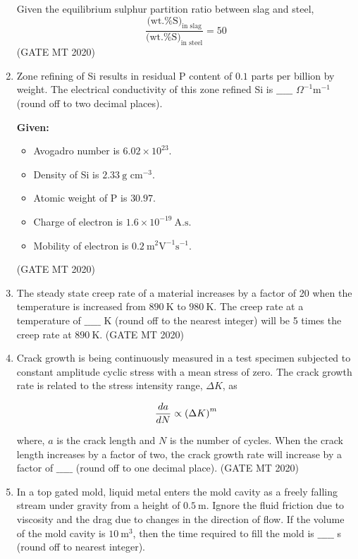\documentclass[journal, 11pt, onecolumn]{IEEEtran}
\theoremstyle{remark}
\begin{document}
\begin{enumerate}
Given the equilibrium sulphur partition ratio between slag and steel,  
$$
\frac{\text{(wt.\% S)}_{\text{in slag}}}{\text{(wt.\% S)}_{\text{in steel}}} = 50
$$
\hfill(GATE MT 2020)


\item Zone refining of Si results in residual P content of $0.1$ parts per billion by weight. The electrical conductivity of this zone refined Si is $\_\_\_\_\_$ $\Omega^{-1}\text{m}^{-1}$ (round off to two decimal places).  

\textbf{Given:}  
\begin{itemize}
\item Avogadro number is $6.02 \times 10^{23}$.  
\item Density of Si is $2.33 \ \text{g cm}^{-3}$.  
\item Atomic weight of P is $30.97$.  
\item Charge of electron is $1.6 \times 10^{-19} \ \text{A.s}$.  
\item Mobility of electron is $0.2 \ \text{m}^2 \text{V}^{-1} \text{s}^{-1}$.  
\end{itemize}
\hfill(GATE MT 2020)


\item The steady state creep rate of a material increases by a factor of 20 when the temperature is increased from $890 \ \text{K}$ to $980 \ \text{K}$. The creep rate at a temperature of $\_\_\_\_\_$ K (round off to the nearest integer) will be 5 times the creep rate at $890 \ \text{K}$.  
\hfill(GATE MT 2020)


\item Crack growth is being continuously measured in a test specimen subjected to constant amplitude cyclic stress with a mean stress of zero. The crack growth rate is related to the stress intensity range, $\Delta K$, as  

$$
\frac{da}{dN} \propto \left(\Delta K\right)^m
$$

where, $a$ is the crack length and $N$ is the number of cycles. When the crack length increases by a factor of two, the crack growth rate will increase by a factor of $\_\_\_\_\_$ (round off to one decimal place).  
\hfill(GATE MT 2020)


\item In a top gated mold, liquid metal enters the mold cavity as a freely falling stream under gravity from a height of $0.5 \ \text{m}$. Ignore the fluid friction due to viscosity and the drag due to changes in the direction of flow. If the volume of the mold cavity is $10 \ \text{m}^3$, then the time required to fill the mold is $\_\_\_\_\_$ s (round off to nearest integer).  


\end{enumerate}
\end{document}
